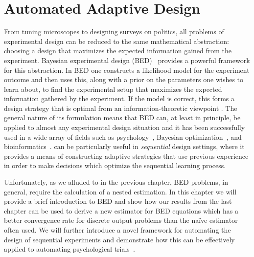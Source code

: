 
\chapter{Automated Adaptive Design}
\label{chp:design}

From tuning microscopes to designing surveys on politics, all problems of 
experimental design can be reduced to the same mathematical abstraction:
choosing a design that maximizes the expected information gained from the 
experiment.
Bayesian experimental design (BED)~\citep{chaloner1995bayesian,sebastiani2000maximum} 
provides a powerful framework for this abstraction.  In BED
one constructs a likelihood model for the experiment outcome and then uses this, along
with a prior on the parameters one wishes to learn about, to find the experimental setup
that maximizes the expected information gathered by the experiment.  
If the model is correct, this forms a design strategy that is optimal from
an information-theoretic viewpoint \citep{sebastiani2000maximum}.  
The general nature of its formulation means that BED can, at least in principle, be applied
to almost any experimental design situation and it has been successfully used in a wide
array of fields such as psychology~\citep{myung2013tutorial,Cavagnaro:discounting,vincent2017darc},
Bayesian optimization~\citep{hennig2012entropy,hernandez2014predictive}, and
bioinformatics~\citep{vanlier2012bayesian}. \Bad can be particularly useful in \emph{sequential}
design settings, where it provides a means of constructing adaptive strategies that use
previous experience in order to make decisions which optimize the sequential learning process.

Unfortunately, as we alluded to in the previous chapter, BED problems, in
general,  require the calculation of a nested estimation.
In this chapter we will provide a brief introduction to BED and show how our results
from the last chapter can be used to derive a new estimator for BED equations 
which has a better convergence rate for discrete output problems than the na\"{i}ve
estimator often used.  We will further introduce a novel framework for automating the
design of sequential experiments and demonstrate how this can be
effectively applied to automating psychological trials~\citep{vincent2017darc}.  




